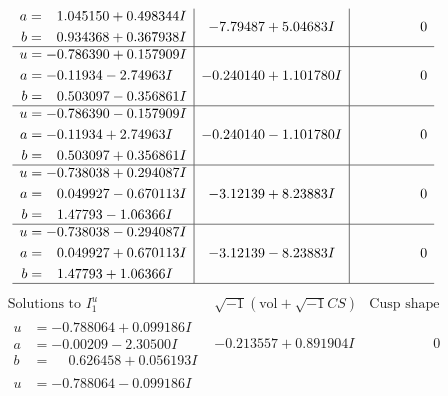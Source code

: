 \documentclass[1p]{elsarticle_modified}
\theoremstyle{definition}
\newcommand{\I}{\sqrt{-1}}
\begin{document}
$$\begin{array}{c|c|c}
\begin{aligned}
a &= \phantom{-}1.045150 + 0.498344 I \\
b &= \phantom{-}0.934368 + 0.367938 I\end{aligned}
 & -7.79487 + 5.04683 I & \phantom{-0.000000 } 0 \\ \hline\begin{aligned}
u &= -0.786390 + 0.157909 I \\
a &= -0.11934 - 2.74963 I \\
b &= \phantom{-}0.503097 - 0.356861 I\end{aligned}
 & -0.240140 + 1.101780 I & \phantom{-0.000000 } 0 \\ \hline\begin{aligned}
u &= -0.786390 - 0.157909 I \\
a &= -0.11934 + 2.74963 I \\
b &= \phantom{-}0.503097 + 0.356861 I\end{aligned}
 & -0.240140 - 1.101780 I & \phantom{-0.000000 } 0 \\ \hline\begin{aligned}
u &= -0.738038 + 0.294087 I \\
a &= \phantom{-}0.049927 - 0.670113 I \\
b &= \phantom{-}1.47793 - 1.06366 I\end{aligned}
 & -3.12139 + 8.23883 I & \phantom{-0.000000 } 0 \\ \hline\begin{aligned}
u &= -0.738038 - 0.294087 I \\
a &= \phantom{-}0.049927 + 0.670113 I \\
b &= \phantom{-}1.47793 + 1.06366 I\end{aligned}
 & -3.12139 - 8.23883 I & \phantom{-0.000000 } 0\\
 \hline 
 \end{array}$$\newpage$$\begin{array}{c|c|c}  
\text{Solutions to }I^u_{1}& \I (\text{vol} + \sqrt{-1}CS) & \text{Cusp shape}\\
 \hline 
\begin{aligned}
u &= -0.788064 + 0.099186 I \\
a &= -0.00209 - 2.30500 I \\
b &= \phantom{-}0.626458 + 0.056193 I\end{aligned}
 & -0.213557 + 0.891904 I & \phantom{-0.000000 } 0 \\ \hline\begin{aligned}
u &= -0.788064 - 0.099186 I \\

\end{aligned}
\end{array}$$
\end{document}
